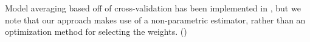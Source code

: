 \documentclass[NETN,manuscript]{stjour-new}
\newcommand{\skcomment}[1]{({\color{blue}{SK's comment:}}\textbf{\color{blue}{#1}})}
\begin{document}
Model averaging based off of cross-validation has been implemented in \citet{Gao2016-qe}, but we note that our approach makes use of a non-parametric estimator, rather than an optimization method for selecting the weights.  \skcomment{CITE METHOD THAT SELECTS WEIGHTS IN KERNEL (has catchy name)}












\end{document}

